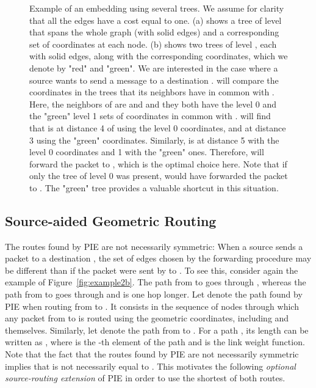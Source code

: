 \documentclass[conference]{IEEEtran}
\begin{document}
\begin{figure}[t]
\vspace{0.1in}
\centering
{}\hfil
{}
\caption{Example of an embedding using several trees. We assume for  clarity that all the edges have a cost equal to one. (a) shows a tree of level  that spans the whole graph (with solid edges) and a corresponding set of coordinates at each node. (b) shows two trees of level , each with solid edges, along with the corresponding coordinates, which we denote by "red" and "green". We are interested in the case where a source  wants to send a message to a destination .  will compare the coordinates in the trees that its neighbors have in common with . Here, the neighbors of  are  and  and they both have the level 0 and the "green" level 1 sets of coordinates in common with .  will find that  is at distance 4 of  using the level 0 coordinates, and at distance 3 using the "green" coordinates. Similarly,  is at distance 5 with the level 0 coordinates and 1 with the "green" ones. Therefore,  will forward the packet to , which is the optimal choice here. Note that if only the tree of level 0 was present,  would have forwarded the packet to . The "green" tree provides a valuable shortcut in this situation.}
\vspace{-1.5em}
\label{fig:example2}
\end{figure}



\subsection{Source-aided Geometric Routing}
\label{sec:asym}
The routes found by PIE are not necessarily symmetric: When a source  sends a packet to a destination , the set of edges chosen by the forwarding procedure may be different than if the packet were sent by  to . To see this, consider again the example of Figure~\ref{fig:example2b}. The path from  to  goes through , whereas the path from  to  goes through  and is one hop longer.
Let  denote the path found by PIE when routing from  to .
It consists in the sequence of nodes through which any packet from  to  is routed using the geometric coordinates, including  and  themselves.
Similarly, let  denote the path from  to .
For a path , its length can be written as , where  is the -th element of the path  and  is the link weight function. Note that the fact that the routes found by PIE are not necessarily symmetric implies that  is not necessarily equal to . This motivates the following \emph{optional source-routing extension} of PIE in order to use the shortest of both routes.
\end{document}
